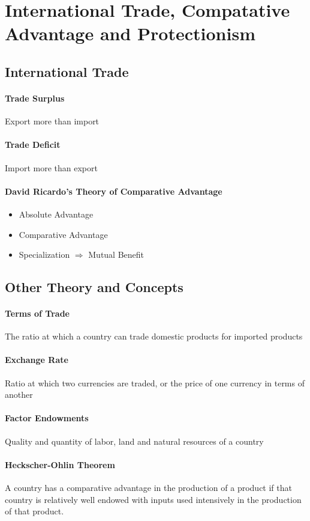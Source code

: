 \documentclass[11pt]{article}
\begin{document}
\section{International Trade, Compatative Advantage and  Protectionism}
\subsection{International Trade}
\paragraph{Trade Surplus}
Export more than import
\paragraph{Trade Deficit}
Import more than export
\paragraph{David Ricardo's Theory of Comparative Advantage}
\begin{itemize}
    \item Absolute Advantage
    \item Comparative Advantage
    \item Specialization $\Rightarrow$ Mutual Benefit
\end{itemize}
\subsection{Other Theory and Concepts}
\paragraph{Terms of Trade}
The ratio at which a country can trade domestic products for imported products
\paragraph{Exchange Rate}
Ratio at which two currencies are traded, or the price of one currency in terms of another
\paragraph{Factor Endowments}
Quality and quantity of labor, land and natural resources of a country
\paragraph{Heckscher-Ohlin Theorem} A country has a comparative advantage in the production of a product if that country is relatively well endowed with inputs used intensively in the production of that product.
\end{document}
